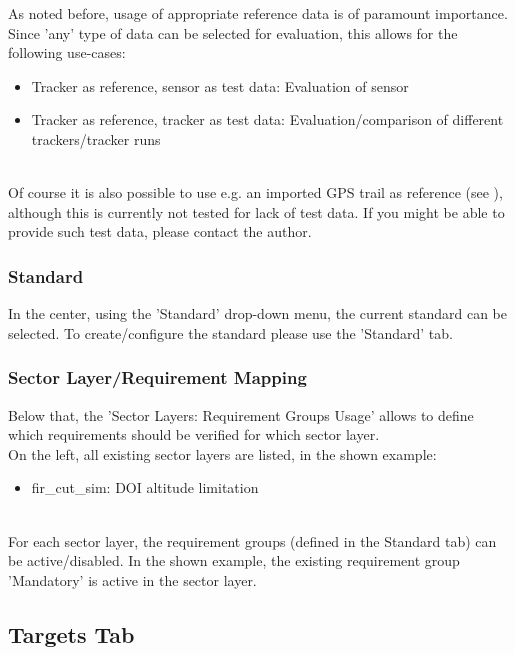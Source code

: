 As noted before, usage of appropriate reference data is of paramount importance. \\

Since 'any' type of data can be selected for evaluation, this allows for the following use-cases:
\begin{itemize}  
\item Tracker as reference, sensor as test data: Evaluation of sensor
\item Tracker as reference, tracker as test data: Evaluation/comparison of different trackers/tracker runs
\end{itemize}
\ \\

Of course it is also possible to use e.g. an imported GPS trail as reference (see ), although this is currently not tested for lack of test data. If you might be able to provide such test data, please contact the author. \\

\subsubsection{Standard}
In the center, using the 'Standard' drop-down menu, the current standard can be selected. To create/configure the standard please use the 'Standard' tab.

\subsubsection{Sector Layer/Requirement Mapping}

Below that, the 'Sector Layers: Requirement Groups Usage' allows to define which requirements should be verified for which sector layer. \\

On the left, all existing sector layers are listed, in the shown example:
\begin{itemize}  
\item fir\_cut\_sim: DOI altitude limitation
\end{itemize}
\ \\

For each sector layer, the requirement groups (defined in the Standard tab) can be active/disabled. In the shown example, the existing requirement group 'Mandatory' is active in the sector layer.

\subsection{Targets Tab}

